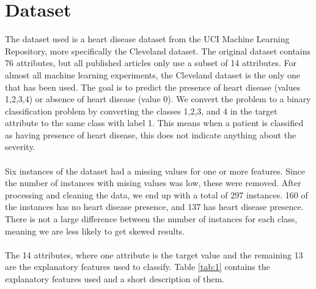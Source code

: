 \documentclass[a4paper,twocolumn]{article}
\begin{document}
\section{Dataset}
The dataset used is a heart disease dataset from the UCI Machine Learning Repository, more specifically the Cleveland dataset\cite{dataset}. The original dataset contains 76 attributes, but all published articles only use a subset of 14 attributes. For almost all machine learning experiments, the Cleveland dataset is the only one that has been used. The goal is to predict the presence of heart disease (values 1,2,3,4) or absence of heart disease (value 0). We convert the problem to a binary classification problem by converting the classes 1,2,3, and 4 in the target attribute to the same class with label 1. This means when a patient is classified as having presence of heart disease, this does not indicate anything about the severity.\\
\\
Six instances of the dataset had a missing values for one or more features. Since the number of instances with mising values was low, these were removed. After processing and cleaning the data, we end up with a total of 297 instances. 160 of the instances has no heart disease presence, and 137 has heart disease presence. There is not a large difference between the number of instances for each class, meaning we are less likely to get skewed results.\\
\\
The 14 attributes, where one attribute is the target value and the remaining 13 are the explanatory features used to classify. Table \ref{tab:1} contains the explanatory features used and a short description of them.
\end{document}

